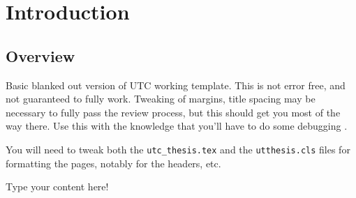 \chapter{Introduction} \label{ch:introduction}

\section{Overview}
Basic blanked out version of UTC working template. This is not error free, and not guaranteed to fully work. Tweaking of margins, title spacing may be necessary to fully pass the review process, but this should get you most of the way there. Use this with the knowledge that you'll have to do some debugging \cite{utclatex}.

You will need to tweak both the \lstinline{utc_thesis.tex} and the \lstinline{utthesis.cls} files for formatting the pages, notably for the headers, etc.

Type your content here!
